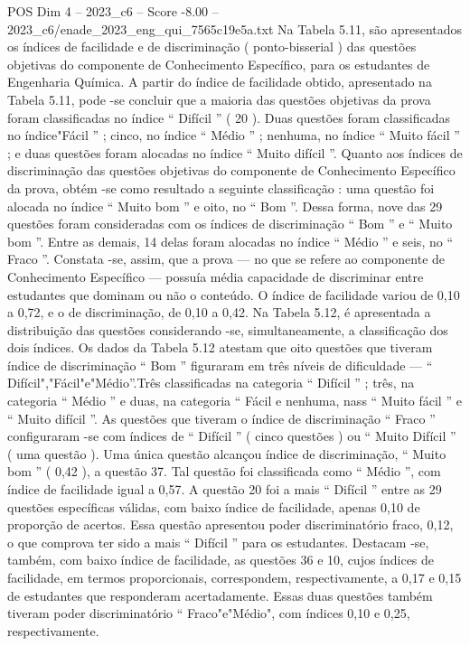 \begin{textsample}{POS Dim 4 – 2023\_c6 – Score -8.00 – 2023\_c6/enade\_2023\_eng\_qui\_7565c19e5a.txt}
Na Tabela 5.11, são apresentados os índices de facilidade e de discriminação ( ponto-bisserial ) das questões objetivas do componente de Conhecimento Específico, para os estudantes de Engenharia Química.
A partir do índice de facilidade obtido, apresentado na Tabela 5.11, pode -se concluir que a maioria das questões objetivas da prova foram classificadas no índice “ Difícil ” ( 20 ).
Duas questões foram classificadas no índice"Fácil ” ; cinco, no índice “ Médio ” ; nenhuma, no índice “ Muito fácil ” ; e duas questões foram alocadas no índice “ Muito difícil ”.
Quanto aos índices de discriminação das questões objetivas do componente de Conhecimento Específico da prova, obtém -se como resultado a seguinte classificação : uma questão foi alocada no índice “ Muito bom ” e oito, no “ Bom ”.
Dessa forma, nove das 29 questões foram consideradas com os índices de discriminação “ Bom ” e “ Muito bom ”.
Entre as demais, 14 delas foram alocadas no índice “ Médio ” e seis, no “ Fraco ”.
Constata -se, assim, que a prova — no que se refere ao componente de Conhecimento Específico — possuía média capacidade de discriminar entre estudantes que dominam ou não o conteúdo.
O índice de facilidade variou de 0,10 a 0,72, e o de discriminação, de 0,10 a 0,42.
Na Tabela 5.12, é apresentada a distribuição das questões considerando -se, simultaneamente, a classificação dos dois índices.
Os dados da Tabela 5.12 atestam que oito questões que tiveram índice de discriminação “ Bom ” figuraram em três níveis de dificuldade — “ Difícil","Fácil"e"Médio”.Três classificadas na categoria “ Difícil ” ; três, na categoria “ Médio ” e duas, na categoria “ Fácil e nenhuma, nass “ Muito fácil ” e “ Muito difícil ”.
As questões que tiveram o índice de discriminação “ Fraco ” configuraram -se com índices de “ Difícil ” ( cinco questões ) ou “ Muito Difícil ” ( uma questão ).
Uma única questão alcançou índice de discriminação, “ Muito bom ” ( 0,42 ), a questão 37.
Tal questão foi classificada como “ Médio ”, com índice de facilidade igual a 0,57.
A questão 20 foi a mais “ Difícil ” entre as 29 questões específicas válidas, com baixo índice de facilidade, apenas 0,10 de proporção de acertos.
Essa questão apresentou poder discriminatório fraco, 0,12, o que comprova ter sido a mais “ Difícil ” para os estudantes.
Destacam -se, também, com baixo índice de facilidade, as questões 36 e 10, cujos índices de facilidade, em termos proporcionais, correspondem, respectivamente, a 0,17 e 0,15 de estudantes que responderam acertadamente.
Essas duas questões também tiveram poder discriminatório “ Fraco"e"Médio", com índices 0,10 e 0,25, respectivamente.

\end{textsample}
